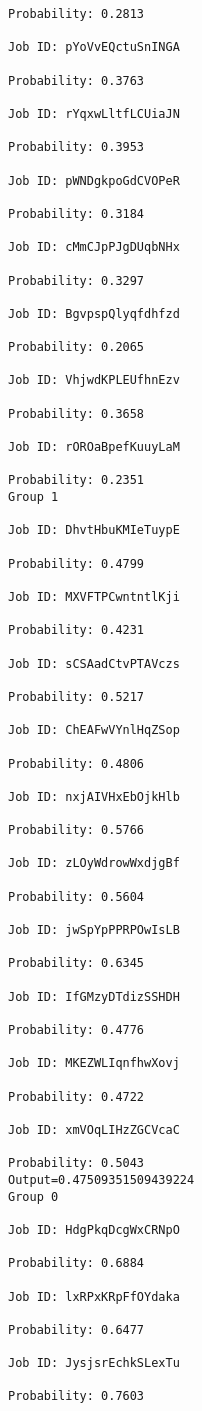 \documentclass[11pt]{article}
\begin{document}
\begin{Verbatim}[commandchars=\\\{\}]
Probability: 0.2813

Job ID: pYoVvEQctuSnINGA

Probability: 0.3763

Job ID: rYqxwLltfLCUiaJN

Probability: 0.3953

Job ID: pWNDgkpoGdCVOPeR

Probability: 0.3184

Job ID: cMmCJpPJgDUqbNHx

Probability: 0.3297

Job ID: BgvpspQlyqfdhfzd

Probability: 0.2065

Job ID: VhjwdKPLEUfhnEzv

Probability: 0.3658

Job ID: rOROaBpefKuuyLaM

Probability: 0.2351
Group 1

Job ID: DhvtHbuKMIeTuypE

Probability: 0.4799

Job ID: MXVFTPCwntntlKji

Probability: 0.4231

Job ID: sCSAadCtvPTAVczs

Probability: 0.5217

Job ID: ChEAFwVYnlHqZSop

Probability: 0.4806

Job ID: nxjAIVHxEbOjkHlb

Probability: 0.5766

Job ID: zLOyWdrowWxdjgBf

Probability: 0.5604

Job ID: jwSpYpPPRPOwIsLB

Probability: 0.6345

Job ID: IfGMzyDTdizSSHDH

Probability: 0.4776

Job ID: MKEZWLIqnfhwXovj

Probability: 0.4722

Job ID: xmVOqLIHzZGCVcaC

Probability: 0.5043
Output=0.47509351509439224
Group 0

Job ID: HdgPkqDcgWxCRNpO

Probability: 0.6884

Job ID: lxRPxKRpFfOYdaka

Probability: 0.6477

Job ID: JysjsrEchkSLexTu

Probability: 0.7603


\end{Verbatim}
\end{document}
